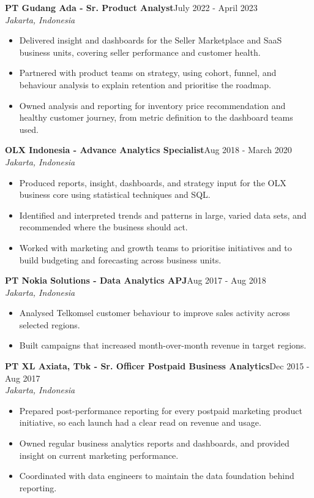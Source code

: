 ﻿\documentclass[10.5pt,a4paper]{article}
\newcommand{\role}[3]{%
  \vspace{3pt}%
  {\bfseries #1}\hfill{\small #3}\\
  {\itshape #2}\par\vspace{1pt}%
}
\begin{document}
\role{PT Gudang Ada - Sr. Product Analyst}{Jakarta, Indonesia}{July 2022 - April 2023}
\begin{itemize}
  \item Delivered insight and dashboards for the Seller Marketplace and SaaS business units, covering seller performance and customer health.
  \item Partnered with product teams on strategy, using cohort, funnel, and behaviour analysis to explain retention and prioritise the roadmap.
  \item Owned analysis and reporting for inventory price recommendation and healthy customer journey, from metric definition to the dashboard teams used.
\end{itemize}

\role{OLX Indonesia - Advance Analytics Specialist}{Jakarta, Indonesia}{Aug 2018 - March 2020}
\begin{itemize}
  \item Produced reports, insight, dashboards, and strategy input for the OLX business core using statistical techniques and SQL.
  \item Identified and interpreted trends and patterns in large, varied data sets, and recommended where the business should act.
  \item Worked with marketing and growth teams to prioritise initiatives and to build budgeting and forecasting across business units.
\end{itemize}

\role{PT Nokia Solutions - Data Analytics APJ}{Jakarta, Indonesia}{Aug 2017 - Aug 2018}
\begin{itemize}
  \item Analysed Telkomsel customer behaviour to improve sales activity across selected regions.
  \item Built campaigns that increased month-over-month revenue in target regions.
\end{itemize}

\role{PT XL Axiata, Tbk - Sr. Officer Postpaid Business Analytics}{Jakarta, Indonesia}{Dec 2015 - Aug 2017}
\begin{itemize}
  \item Prepared post-performance reporting for every postpaid marketing product initiative, so each launch had a clear read on revenue and usage.
  \item Owned regular business analytics reports and dashboards, and provided insight on current marketing performance.
  \item Coordinated with data engineers to maintain the data foundation behind reporting.
\end{itemize}
\end{document}
